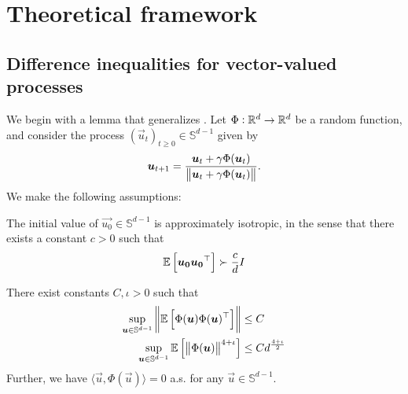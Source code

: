  

\section{Theoretical framework}
\label{2405:sec:app:framework}

\subsection{Difference inequalities for vector-valued processes}

We begin with a lemma that generalizes \cite[Proposition 4.1]{arous2021online}. Let $\Phi: \mathbb{R}^d \to \mathbb{R}^d$ be a random function, and consider the process $(\vec{u}_t)_{t \geq 0} \in \mathbb{S}^{d-1}$ given by
\[ {\boldsymbol{u}}_{t+1} = \frac{{\boldsymbol{u}}_t + \gamma \Phi({\boldsymbol{u}}_t)}{\left\lVert {\boldsymbol{u}}_t + \gamma \Phi({\boldsymbol{u}}_t)\right\rVert}. \]
We make the following assumptions:
\begin{assumption}\label{2405:assump:app:initialization}
  The initial value of $\vec{u_0} \in \mathbb{S}^{d-1}$ is approximately isotropic, in the sense that there exists a constant $c > 0$ such that
  \[ \mathbb{E}\left[{\boldsymbol{u_0}}{\boldsymbol{u_0}}^\top\right] \succ \frac{c}d I\]
\end{assumption}
\begin{assumption}\label{2405:assump:app:concentration}
  There exist constants $C, \iota > 0$ such that
  \begin{align}
    \sup_{{\boldsymbol{u}} \in \mathbb{S}^{d-1}}  \left\lVert \mathbb{E}\left[\Phi({\boldsymbol{u}})\Phi({\boldsymbol{u}})^\top\right]\right\rVert &\leq C \\
    \sup_{{\boldsymbol{u}} \in \mathbb{S}^{d-1}}  \mathbb{E}\left[\left\lVert \Phi({\boldsymbol{u}})\right\rVert^{4 + \iota}\right] &\leq C d^{\frac{4 + \iota}2}
  \end{align}
  Further, we have $\langle \vec{u}, \Phi(\vec{u}) \rangle = 0$ a.s. for any $\vec{u} \in \mathbb{S}^{d-1}$.
\end{assumption}

